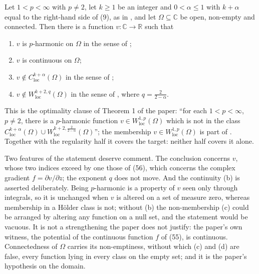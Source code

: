 \begin{theorem}
Let $1<p<\infty$ with $p\neq2$, let $k\ge1$ be an integer and $0<\alpha\le1$
with $k+\alpha$ equal to the right-hand side of (9), as in
, and let $\Omega\subseteq\mathbb{C}$ be open, non-empty and connected.
Then there is a function $v\colon\mathbb{C}\to\mathbb{R}$ such that
\begin{enumerate}
\item[(a)] $v$ is $p$-harmonic on $\Omega$ in the sense of
  ;
\item[(b)] $v$ is continuous on $\Omega$;
\item[(c)] $v\notin C^{k+\alpha}_{\mathrm{loc}}(\Omega)$ in the sense of
  ;
\item[(d)] $v\notin W^{k+2,q}_{\mathrm{loc}}(\Omega)$ in the sense of
  , where $q=\frac{2}{2-\alpha}$.
\end{enumerate}

This is the optimality clause of Theorem 1 of the paper: ``for each
$1<p<\infty$, $p\neq2$, there is a $p$-harmonic function
$v\in W^{1,p}_{\mathrm{loc}}(\Omega)$ which is not in the class
$C^{k+\alpha}_{\mathrm{loc}}(\Omega)\cup W^{k+2,\frac{2}{2-\alpha}}
_{\mathrm{loc}}(\Omega)$''; the membership $v\in W^{1,p}_{\mathrm{loc}}(\Omega)$
is part of .  Together with the regularity half it covers
the target: neither half covers it alone.

Two features of the statement deserve comment.  The conclusion concerns $v$,
whose two indices exceed by one those of (56), which concerns the complex
gradient $f=\partial v/\partial z$; the exponent $q$ does not move.  And the
continuity (b) is asserted deliberately.  Being $p$-harmonic is a property of
$v$ seen only through integrals, so it is unchanged when $v$ is altered on a
set of measure zero, whereas membership in a Hölder class is not; without (b)
the non-membership (c) could be arranged by altering any function on a null
set, and the statement would be vacuous.  It is not a strengthening the paper
does not justify: the paper's own witness, the potential of the continuous
function $f$ of (55), is continuous.  Connectedness of $\Omega$ carries its
non-emptiness, without which (c) and (d) are false, every function lying in
every class on the empty set; and it is the paper's hypothesis on the domain.
\end{theorem}

